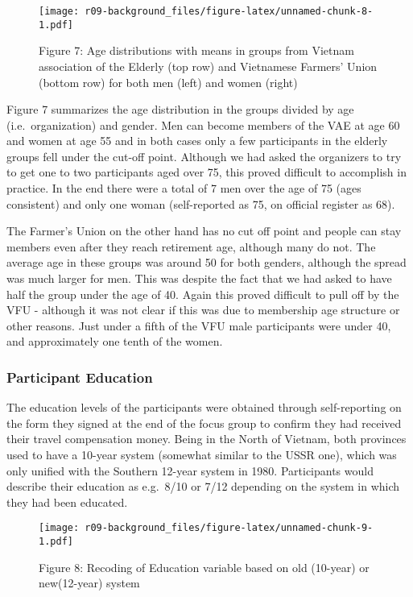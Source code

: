 \documentclass[]{article}
\begin{document}
\begin{figure}
\centering
\texttt{[image: r09-background\_files/figure-latex/unnamed-chunk-8-1.pdf]}
\caption{Figure 7: Age distributions with means in groups from Vietnam
association of the Elderly (top row) and Vietnamese Farmers' Union
(bottom row) for both men (left) and women (right)}
\end{figure}

Figure 7 summarizes the age distribution in the groups divided by age
(i.e.~organization) and gender. Men can become members of the VAE at age
60 and women at age 55 and in both cases only a few participants in the
elderly groups fell under the cut-off point. Although we had asked the
organizers to try to get one to two participants aged over 75, this
proved difficult to accomplish in practice. In the end there were a
total of 7 men over the age of 75 (ages consistent) and only one woman
(self-reported as 75, on official register as 68).

The Farmer's Union on the other hand has no cut off point and people can
stay members even after they reach retirement age, although many do not.
The average age in these groups was around 50 for both genders, although
the spread was much larger for men. This was despite the fact that we
had asked to have half the group under the age of 40. Again this proved
difficult to pull off by the VFU - although it was not clear if this was
due to membership age structure or other reasons. Just under a fifth of
the VFU male participants were under 40, and approximately one tenth of
the women.

\hypertarget{participant-education}{%
\subsubsection{Participant Education}\label{participant-education}}

The education levels of the participants were obtained through
self-reporting on the form they signed at the end of the focus group to
confirm they had received their travel compensation money. Being in the
North of Vietnam, both provinces used to have a 10-year system (somewhat
similar to the USSR one), which was only unified with the Southern
12-year system in 1980. Participants would describe their education as
e.g.~8/10 or 7/12 depending on the system in which they had been
educated.

\begin{figure}
\centering
\texttt{[image: r09-background\_files/figure-latex/unnamed-chunk-9-1.pdf]}
\caption{Figure 8: Recoding of Education variable based on old (10-year)
or new(12-year) system}
\end{figure}
\end{document}
